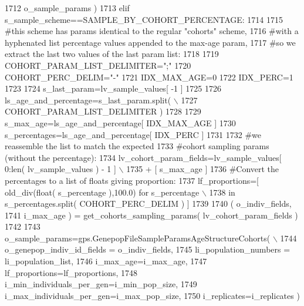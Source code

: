 \begin{DoxyCode}
1712                                                                     o\_sample\_params )
1713     \textcolor{keywordflow}{elif} s\_sample\_scheme==SAMPLE\_BY\_COHORT\_PERCENTAGE:
1714 
1715         \textcolor{comment}{#this scheme has params identical to the regular "cohorts" scheme,}
1716         \textcolor{comment}{#with a hyphenated list percentage values appended to the max-age param, }
1717         \textcolor{comment}{#so we extract the last two values of the last param list:  }
1718         
1719         COHORT\_PARAM\_LIST\_DELIMITER=\textcolor{stringliteral}{";"}
1720         COHORT\_PERC\_DELIM=\textcolor{stringliteral}{"-"}
1721         IDX\_MAX\_AGE=0
1722         IDX\_PERC=1
1723 
1724         s\_last\_param=lv\_sample\_values[ -1 ]
1725 
1726         ls\_age\_and\_percentage=s\_last\_param.split( \(\backslash\)
1727                         COHORT\_PARAM\_LIST\_DELIMITER )
1728 
1729         s\_max\_age=ls\_age\_and\_percentage[ IDX\_MAX\_AGE ]
1730         s\_percentages=ls\_age\_and\_percentage[ IDX\_PERC ]
1731         
1732         \textcolor{comment}{#we reassemble the list to match the expected}
1733         \textcolor{comment}{#cohort sampling params (without the percentage):}
1734         lv\_cohort\_param\_fields=lv\_sample\_values[ 0:len( lv\_sample\_values ) - 1 ] \(\backslash\)
1735                                                             + [ s\_max\_age ]     
1736         \textcolor{comment}{#Convert the percentages to a list of floats giving proportion:}
1737         lf\_proportions=[ old\_div(float( s\_percentage ),100.0) \textcolor{keywordflow}{for} s\_percentage  \(\backslash\)
1738                             \textcolor{keywordflow}{in} s\_percentages.split( COHORT\_PERC\_DELIM ) ]
1739 
1740         ( o\_indiv\_fields,
1741                 i\_max\_age ) = get\_cohorts\_sampling\_params( lv\_cohort\_param\_fields )
1742 
1743         o\_sample\_params=gps.GenepopFileSampleParamsAgeStructureCohorts( \(\backslash\)
1744                                             o\_genepop\_indiv\_id\_fields = o\_indiv\_fields,
1745                                             li\_population\_numbers = li\_population\_list,
1746                                             i\_max\_age=i\_max\_age,
1747                                             lf\_proportions=lf\_proportions,
1748                                             i\_min\_individuals\_per\_gen=i\_min\_pop\_size,
1749                                             i\_max\_individuals\_per\_gen=i\_max\_pop\_size,
1750                                             i\_replicates=i\_replicates )

\end{DoxyCode}
